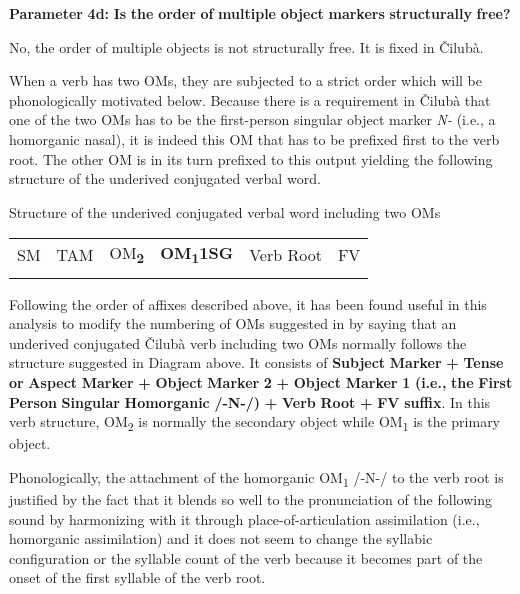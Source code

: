 \documentclass[output=paper]{langscibook}
\begin{document}
\textbf{Parameter} \textbf{4d:} \textbf{Is} \textbf{the} \textbf{order} \textbf{of} \textbf{multiple} \textbf{object} \textbf{markers} \textbf{structurally} \textbf{free?}

No, the order of multiple objects is not structurally free. It is fixed in Čilubà. 

When a verb has two OMs, they are subjected to a strict order which will be phonologically motivated below. Because there is a requirement in Čilubà that one of the two OMs has to be the first-person singular object marker \textit{N-} (i.e., a homorganic nasal), it is indeed this OM that has to be prefixed first to the verb root. The other OM is in its turn prefixed to this output yielding the following structure of the underived conjugated verbal word. 

\ea%
    \label{ex:lukusa:43}
    \z

          Structure of the underived conjugated verbal word including two OMs


\begin{tabularx}{\textwidth}{XXXXXX}

\lsptoprule

 SM & TAM & OM\textbf{\textsubscript{2}} & \textbf{OM\textsubscript{1}}\textbf{1SG} & Verb Root & FV\\
\lspbottomrule
\end{tabularx}
Following the order of affixes described above, it has been found useful in this analysis to modify the numbering of OMs suggested in \citet{MartenEtAl2007} by saying that an underived conjugated Čilubà verb including two OMs normally follows the structure suggested in Diagram  above. It consists of \textbf{Subject} \textbf{Marker} \textbf{+} \textbf{Tense} \textbf{or} \textbf{Aspect} \textbf{Marker} \textbf{+} \textbf{Object} \textbf{Marker} \textbf{2} \textbf{+} \textbf{Object} \textbf{Marker} \textbf{1} \textbf{(i.e.,} \textbf{the} \textbf{First} \textbf{Person} \textbf{Singular} \textbf{Homorganic} \textbf{/-N-/)} \textbf{+} \textbf{Verb} \textbf{Root} \textbf{+} \textbf{FV} \textbf{suffix}. In this verb structure, OM\textsubscript{2} is normally the secondary object while OM\textsubscript{1} is the primary object.

Phonologically, the attachment of the homorganic OM\textsubscript{1} /-N-/ to the verb root is justified by the fact that it blends so well to the pronunciation of the following sound by harmonizing with it through place-of-articulation assimilation (i.e., homorganic assimilation) and it does not seem to change the syllabic configuration or the syllable count of the verb because it becomes part of the onset of the first syllable of the verb root.
\end{document}
